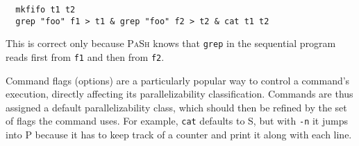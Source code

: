 \documentclass[sigplan, review, screen, anonymous]{acmart}
\newcommand{\heading}[1]{\vspace{4pt}\noindent\textbf{#1}\enspace}
\newcommand{\ttt}[1]{\texttt{#1}}
\newcommand{\cn}[1]{\mbox{\textcircled{\footnotesize #1}}}
\newcommand{\sta}{\cn{\textsc{S}}\xspace}
\newcommand{\pur}{\cn{\textsc{P}}\xspace}
\newcommand{\sid}{\cn{\textsc{E}}\xspace}
\newcommand{\kk}[1]{[{\color{magenta}kk: #1}]}
\newcommand{\sx}[1]{(\S\ref{#1})}
\newcommand{\sys}{{\scshape PaSh}\xspace}
\begin{document}
\begin{verbatim}
  mkfifo t1 t2
  grep "foo" f1 > t1 & grep "foo" f2 > t2 & cat t1 t2
\end{verbatim}

\noindent
This is correct only because \sys knows that \ttt{grep} in the sequential program reads first from \ttt{f1} and then from \ttt{f2}.

Command flags (options) are a particularly popular way to control a command's execution, directly affecting its parallelizability classification.
Commands are thus assigned a default parallelizability class, which should then be refined by the set of flags the command uses.
For example, \ttt{cat} defaults to \sta, but with \ttt{-n} it jumps into \pur because it has to keep track of a counter and print it along with each line.






\end{document}
